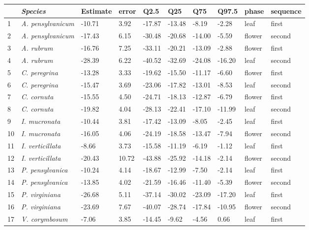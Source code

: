 \documentclass{article}\usepackage[]{graphicx}\usepackage[]{color}
\begin{document}
\begin{table}[ht]
\centering
\begin{tabular}{l>{\itshape}lllllllll}
  \hline
 & Species & Estimate & error & Q2.5 & Q25 & Q75 & Q97.5 & phase & sequence \\ 
  \hline
1 & A. pensylvanicum & -10.71 & 3.92 & -17.87 & -13.48 & -8.19 & -2.28 & leaf & first \\ 
  2 & A. pensylvanicum & -17.43 & 6.15 & -30.48 & -20.68 & -14.00 & -5.59 & flower & second \\ 
  3 & A. rubrum & -16.76 & 7.25 & -33.11 & -20.21 & -13.09 & -2.88 & flower & first \\ 
  4 & A. rubrum & -28.39 & 6.22 & -40.52 & -32.69 & -24.08 & -16.20 & leaf & second \\ 
  5 & C. peregrina & -13.28 & 3.33 & -19.62 & -15.50 & -11.17 & -6.60 & flower & first \\ 
  6 & C. peregrina & -15.47 & 3.69 & -23.06 & -17.82 & -13.01 & -8.53 & leaf & second \\ 
  7 & C. cornuta & -15.55 & 4.50 & -24.71 & -18.13 & -12.87 & -6.79 & flower & first \\ 
  8 & C. cornuta & -19.82 & 4.04 & -28.13 & -22.41 & -17.10 & -11.99 & leaf & second \\ 
  9 & I. mucronata & -10.44 & 3.81 & -17.42 & -13.09 & -8.05 & -2.45 & leaf & first \\ 
  10 & I. mucronata & -16.05 & 4.06 & -24.19 & -18.58 & -13.47 & -7.94 & flower & second \\ 
  11 & I. verticillata & -8.66 & 3.73 & -15.58 & -11.19 & -6.19 & -1.12 & leaf & first \\ 
  12 & I. verticillata & -20.43 & 10.72 & -43.88 & -25.92 & -14.18 & -2.14 & flower & second \\ 
  13 & P. pensylvanica & -10.24 & 4.14 & -18.67 & -12.99 & -7.50 & -2.14 & leaf & first \\ 
  14 & P. pensylvanica & -13.85 & 4.02 & -21.59 & -16.46 & -11.40 & -5.39 & flower & second \\ 
  15 & P. virginiana & -26.68 & 5.11 & -37.14 & -30.02 & -23.09 & -17.20 & leaf & first \\ 
  16 & P. virginiana & -23.69 & 7.67 & -40.07 & -28.74 & -17.84 & -10.95 & flower & second \\ 
  17 & V. corymbosum & -7.06 & 3.85 & -14.45 & -9.62 & -4.56 & 0.66 & leaf & first \\ 

\end{tabular}
\end{table}
\end{document}

